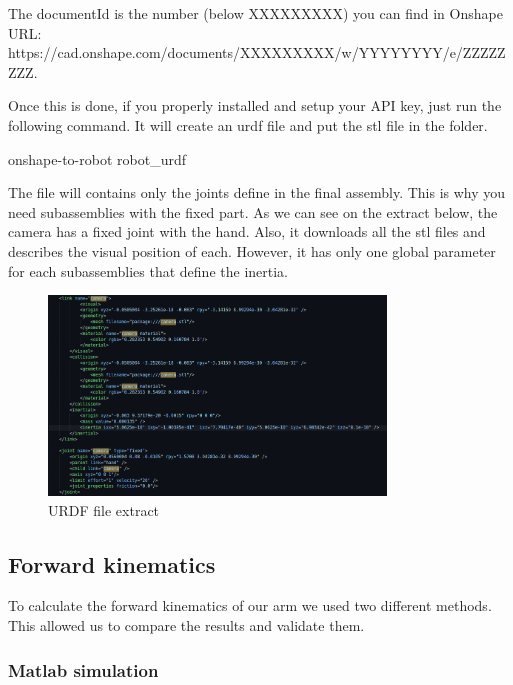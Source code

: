 The documentId is the number (below XXXXXXXXX) you can find in Onshape URL:
\\https://cad.onshape.com/documents/XXXXXXXXX/w/YYYYYYYY/e/ZZZZZZZZ.

\bigbreak
Once this is done, if you properly installed and setup your API key, just run the following command. It will create an urdf file and put the stl file in the folder.
\begin{commandshell}
    onshape-to-robot robot_urdf
\end{commandshell} 

\bigbreak
The file will contains only the joints define in the final assembly. This is why you need subassemblies with the fixed part. As we can see on the extract below, the camera has a fixed joint with the hand. Also, it downloads all the stl files and describes the visual position of each. However, it has only one global parameter for each subassemblies that define the inertia.

\begin{figure}[ht]
    \centering
    \includegraphics[width=0.8\textwidth]{images/Section04/urdf.png}
    \caption{URDF file extract}
    \label{fig:mesh11}
\end{figure}
\FloatBarrier

\subsection{Forward kinematics}

\hspace{\parindent} To calculate the forward kinematics of our arm we used two different methods. This allowed us to compare the results and validate them. 

\subsubsection{Matlab simulation}

